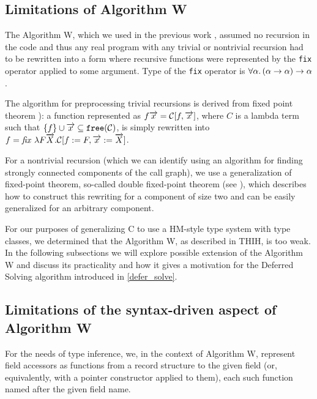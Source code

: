 \subsection{Limitations of Algorithm W}

The Algorithm W, which we used in the previous work \cite{klepl2020type}, assumed no recursion in the code and thus any real program with any trivial or nontrivial recursion had to be rewritten into a form where recursive functions were represented by the \lstinline{fix} operator applied to some argument. Type of the \lstinline{fix} operator is $\forall \alpha . \left(\alpha \to \alpha\right) \to \alpha$.

The algorithm for preprocessing trivial recursions is derived from fixed point theorem \cite{barendregt1992lambda,damas1982principal}): a function represented as $f \overrightarrow{x} = \mathcal{C}[f, \overrightarrow{x}]$, where $C$ is a lambda term such that $\{f\} \cup \overrightarrow{x} \subseteq \mathtt{free} (\mathcal{C})$, is simply rewritten into $f = \mathit{fix}\ \lambda F \overrightarrow{X} .\mathcal{C}[f := F, \overrightarrow{x} := \overrightarrow{X}]$.

For a nontrivial recursion (which we can identify using an algorithm for finding strongly connected components of the call graph), we use a generalization of fixed-point theorem, so-called double fixed-point theorem (see \cite{stepanek}), which describes how to construct this rewriting for a component of size two and can be easily generalized for an arbitrary component.

For our purposes of generalizing C to use a HM-style type system with type classes, we determined that the Algorithm W, as described in THIH, is too weak. In the following subsections we will explore possible extension of the Algorithm W and discuss its practicality and how it gives a motivation for the Deferred Solving algorithm introduced in \cref{defer_solve}.

\subsection{Limitations of the syntax-driven aspect of Algorithm W}
\label{ex_structs}

\begin{defn}
    For the needs of type inference, we, in the context of Algorithm W, represent field accessors as functions from a record structure to the given field (or, equivalently, with a pointer constructor applied to them), each such function named after the given field name.
\end{defn}

